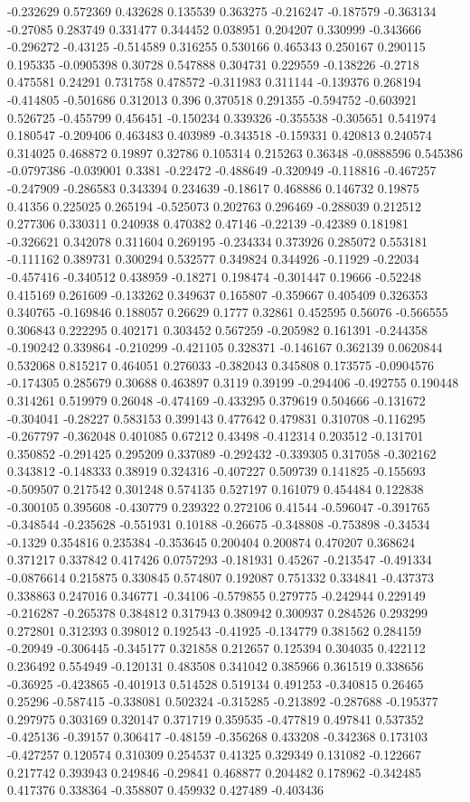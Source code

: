 -0.232629 0.572369 0.432628 0.135539 0.363275 -0.216247 -0.187579 -0.363134 -0.27085 0.283749 0.331477 0.344452 0.038951 0.204207 0.330999 -0.343666 -0.296272 -0.43125 -0.514589 0.316255 0.530166 0.465343 0.250167 0.290115 0.195335 -0.0905398 0.30728 0.547888 0.304731 0.229559 -0.138226 -0.2718 0.475581 0.24291 0.731758 0.478572 -0.311983 0.311144 -0.139376 0.268194 -0.414805 -0.501686 0.312013 0.396 0.370518 0.291355 -0.594752 -0.603921 0.526725 -0.455799 0.456451 -0.150234 0.339326 -0.355538 -0.305651 0.541974 0.180547 -0.209406 0.463483 0.403989 -0.343518 -0.159331 0.420813 0.240574 0.314025 0.468872 0.19897 0.32786 0.105314 0.215263 0.36348 -0.0888596 0.545386 -0.0797386 -0.039001 0.3381 -0.22472 -0.488649 -0.320949 -0.118816 -0.467257 -0.247909 -0.286583 0.343394 0.234639 -0.18617 0.468886 0.146732 0.19875 0.41356 0.225025 0.265194 -0.525073 0.202763 0.296469 -0.288039 0.212512 0.277306 0.330311 0.240938 0.470382 0.47146 -0.22139 -0.42389 0.181981 -0.326621 0.342078 0.311604 0.269195 -0.234334 0.373926 0.285072 0.553181 -0.111162 0.389731 0.300294 0.532577 0.349824 0.344926 -0.11929 -0.22034 -0.457416 -0.340512 0.438959 -0.18271 0.198474 -0.301447 0.19666 -0.52248 0.415169 0.261609 -0.133262 0.349637 0.165807 -0.359667 0.405409 0.326353 0.340765 -0.169846 0.188057 0.26629 0.1777 0.32861 0.452595 0.56076 -0.566555 0.306843 0.222295 0.402171 0.303452 0.567259 -0.205982 0.161391 -0.244358 -0.190242 0.339864 -0.210299 -0.421105 0.328371 -0.146167 0.362139 0.0620844 0.532068 0.815217 0.464051 0.276033 -0.382043 0.345808 0.173575 -0.0904576 -0.174305 0.285679 0.30688 0.463897 0.3119 0.39199 -0.294406 -0.492755 0.190448 0.314261 0.519979 0.26048 -0.474169 -0.433295 0.379619 0.504666 -0.131672 -0.304041 -0.28227 0.583153 0.399143 0.477642 0.479831 0.310708 -0.116295 -0.267797 -0.362048 0.401085 0.67212 0.43498 -0.412314 0.203512 -0.131701 0.350852 -0.291425 0.295209 0.337089 -0.292432 -0.339305 0.317058 -0.302162 0.343812 -0.148333 0.38919 0.324316 -0.407227 0.509739 0.141825 -0.155693 -0.509507 0.217542 0.301248 0.574135 0.527197 0.161079 0.454484 0.122838 -0.300105 0.395608 -0.430779 0.239322 0.272106 0.41544 -0.596047 -0.391765 -0.348544 -0.235628 -0.551931 0.10188 -0.26675 -0.348808 -0.753898 -0.34534 -0.1329 0.354816 0.235384 -0.353645 0.200404 0.200874 0.470207 0.368624 0.371217 0.337842 0.417426 0.0757293 -0.181931 0.45267 -0.213547 -0.491334 -0.0876614 0.215875 0.330845 0.574807 0.192087 0.751332 0.334841 -0.437373 0.338863 0.247016 0.346771 -0.34106 -0.579855 0.279775 -0.242944 0.229149 -0.216287 -0.265378 0.384812 0.317943 0.380942 0.300937 0.284526 0.293299 0.272801 0.312393 0.398012 0.192543 -0.41925 -0.134779 0.381562 0.284159 -0.20949 -0.306445 -0.345177 0.321858 0.212657 0.125394 0.304035 0.422112 0.236492 0.554949 -0.120131 0.483508 0.341042 0.385966 0.361519 0.338656 -0.36925 -0.423865 -0.401913 0.514528 0.519134 0.491253 -0.340815 0.26465 0.25296 -0.587415 -0.338081 0.502324 -0.315285 -0.213892 -0.287688 -0.195377 0.297975 0.303169 0.320147 0.371719 0.359535 -0.477819 0.497841 0.537352 -0.425136 -0.39157 0.306417 -0.48159 -0.356268 0.433208 -0.342368 0.173103 -0.427257 0.120574 0.310309 0.254537 0.41325 0.329349 0.131082 -0.122667 0.217742 0.393943 0.249846 -0.29841 0.468877 0.204482 0.178962 -0.342485 0.417376 0.338364 -0.358807 0.459932 0.427489 -0.403436 
